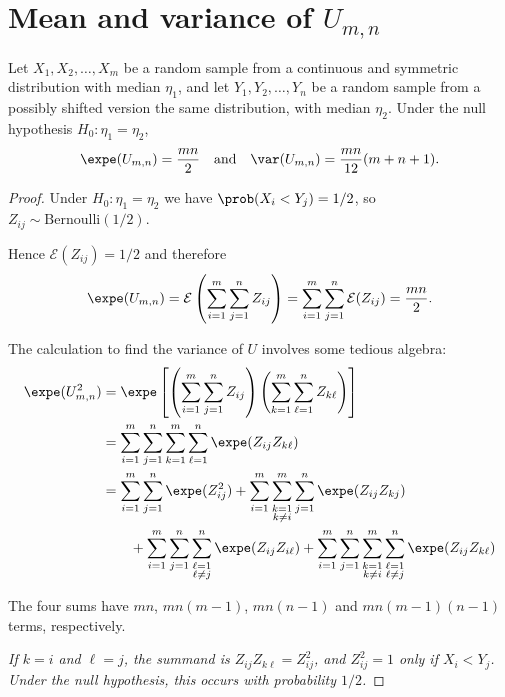 
\section{Mean and variance of $U_{m,n}$}
\begin{theorem}
Let $X_1,X_2,\ldots,X_m$ be a random sample from a continuous and symmetric distribution with median $\eta_1$, and let $Y_1,Y_2,\ldots,Y_n$ be a random sample from a possibly shifted version the same distribution, with median $\eta_2$. Under the null hypothesis $H_0:\eta_1=\eta_2$, 
\[
\expe(U_{m,n}) = \frac{mn}{2}
\text{\quad and\quad}
\var(U_{m,n}) = \frac{mn}{12}(m+n+1).
\]
\end{theorem}

\begin{proof}
Under $H_0:\eta_1=\eta_2$ we have $\prob(X_i<Y_j) = 1/2$, so $Z_{ij}\sim\text{Bernoulli}(1/2)$. 

\vspace*{2ex}
Hence $\mathcal{E}(Z_{ij})=1/2$ and therefore
\[
\expe(U_{m,n}) 
	= \mathcal{E}\left(\sum_{i=1}^m\sum_{j=1}^n Z_{ij}\right)
	= \sum_{i=1}^m\sum_{j=1}^n \mathcal{E}(Z_{ij})
	= \frac{mn}{2}.
\]

The calculation to find the variance of $U$ involves some tedious algebra:
\begin{align*}
\expe(U_{m,n}^2)
	& = \expe\left[\left(\sum_{i=1}^m\sum_{j=1}^n Z_{ij}\right)\left(\sum_{k=1}^m\sum_{\ell=1}^n Z_{k\ell}\right)\right] \\
	& = \sum_{i=1}^m\sum_{j=1}^n\sum_{k=1}^m\sum_{\ell=1}^n \expe(Z_{ij}Z_{k\ell}) \\
	& = \sum_{i=1}^m\sum_{j=1}^n\expe(Z_{ij}^2) 
			+ \sum_{i=1}^m\sum_{\substack{k=1\\k\neq i}}^m\sum_{j=1}^n\expe(Z_{ij}Z_{kj}) \\
	& \qquad + \sum_{i=1}^m\sum_{j=1}^n\sum_{\substack{\ell=1\\\ell\neq j}}^n\expe(Z_{ij}Z_{i\ell})
			+ \sum_{i=1}^m\sum_{j=1}^n\sum_{\substack{k=1\\k\neq i}}^m\sum_{\substack{\ell=1\\\ell\neq j}}^n\expe(Z_{ij}Z_{k\ell}) \\
\end{align*}

The four sums have $mn$, $mn(m-1)$, $mn(n-1)$ and $mn(m-1)(n-1)$ terms, respectively.


\ben
\it 
If $k=i$ and $\ell=j$, the summand is $Z_{ij}Z_{k\ell}=Z_{ij}^2$, and $Z^2_{ij}=1$ only if $X_i<Y_j$. Under the null hypothesis, this occurs with probability $1/2$.



\end{proof}
